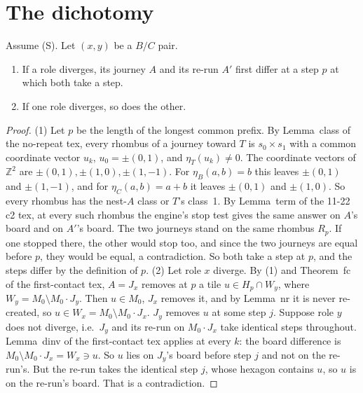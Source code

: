 \documentclass[11pt]{article}
\theoremstyle{definition}\newtheorem{definition}[theorem]{Definition}\newtheorem{remark}[theorem]{Remark}
\newcommand{\Z}{\mathbb Z}
\begin{document}
\section{The dichotomy}\label{sec:dich}
\begin{lemma}\label{lem:both}
Assume (S). Let $(x,y)$ be a $B/C$ pair.
\begin{enumerate}
\item If a role diverges, its journey $A$ and its re-run $A'$ first differ at a step $p$ at which both take a step.
\item If one role diverges, so does the other.
\end{enumerate}
\end{lemma}
\begin{proof}
(1) Let $p$ be the length of the longest common prefix. By Lemma~class of the no-repeat tex, every rhombus of a journey toward $T$ is $s_0\times s_1$ with a common coordinate vector $u_k$, $u_0=\pm(0,1)$, and $\eta_T(u_k)\ne0$. The coordinate vectors of $\Z^2$ are $\pm(0,1),\pm(1,0),\pm(1,-1)$. For $\eta_B(a,b)=b$ this leaves $\pm(0,1)$ and $\pm(1,-1)$, and for $\eta_C(a,b)=a+b$ it leaves $\pm(0,1)$ and $\pm(1,0)$. So every rhombus has the nest-$A$ class or $T$'s class~1. By Lemma~term of the 11-22 c2 tex, at every such rhombus the engine's stop test gives the same answer on $A$'s board and on $A'$'s board. The two journeys stand on the same rhombus $R_p$. If one stopped there, the other would stop too, and since the two journeys are equal before $p$, they would be equal, a contradiction. So both take a step at $p$, and the steps differ by the definition of $p$.
(2) Let role $x$ diverge. By (1) and Theorem~fc of the first-contact tex, $A=J_x$ removes at $p$ a tile $u\in H_p\cap W_y$, where $W_y=M_0\setminus M_0\cdot J_y$. Then $u\in M_0$, $J_x$ removes it, and by Lemma~nr it is never re-created, so $u\in W_x=M_0\setminus M_0\cdot J_x$. $J_y$ removes $u$ at some step $j$. Suppose role $y$ does not diverge, i.e.\ $J_y$ and its re-run on $M_0\cdot J_x$ take identical steps throughout. Lemma~dinv of the first-contact tex applies at every $k$: the board difference is $M_0\setminus M_0\cdot J_x=W_x\ni u$. So $u$ lies on $J_y$'s board before step $j$ and not on the re-run's. But the re-run takes the identical step $j$, whose hexagon contains $u$, so $u$ is on the re-run's board. That is a contradiction.
\end{proof}
\end{document}
